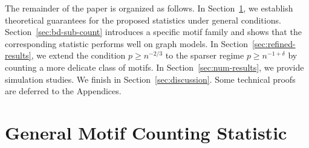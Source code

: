 \documentclass[letterpaper,11pt]{article}
\theoremstyle{definition}
\newcommand{\maH}{\mathcal{H}}
\newcommand{\nbr}[1]{{\sf\color{red}[#1]}}
\newcommand{\indc}[1]{{\mathbf{1}_{\left\{{#1}\right\}}}}
\begin{document}




The remainder of the paper is organized as follows. 
In Section~\ref{sec:general-motif}, we establish theoretical guarantees for the proposed
statistics under general conditions.
Section~\ref{sec:bd-sub-count} introduces a specific motif family and shows
that the corresponding statistic performs well on graph models.
In Section~\ref{sec:refined-results}, we extend the condition $p\ge n^{-2/3}$ to the sparser regime $p\ge n^{-1+\delta}$ by counting a more delicate class of motifs.
In Section~\ref{sec:num-results}, we provide simulation studies. We finish in Section~\ref{sec:discussion}. Some technical proofs are deferred to the Appendices.









\section{General Motif Counting Statistic}\label{sec:general-motif}
\end{document}
